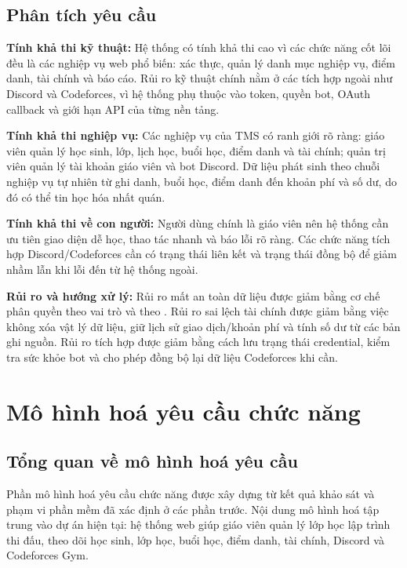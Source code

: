 \documentclass[12pt,a4paper]{article}
\newcommand{\code}[1]{{\ttfamily\seqsplit{#1}}}
\begin{document}
\subsection{Phân tích yêu cầu}

\textbf{Tính khả thi kỹ thuật:} Hệ thống có tính khả thi cao vì các chức năng
cốt lõi đều là các nghiệp vụ web phổ biến: xác thực, quản lý danh mục nghiệp
vụ, điểm danh, tài chính và báo cáo. Rủi ro kỹ thuật chính nằm ở các tích hợp
ngoài như Discord và Codeforces, vì hệ thống phụ thuộc vào token, quyền bot,
OAuth callback và giới hạn API của từng nền tảng.

\textbf{Tính khả thi nghiệp vụ:} Các nghiệp vụ của TMS có ranh giới rõ ràng:
giáo viên quản lý học sinh, lớp, lịch học, buổi học, điểm danh và tài chính;
quản trị viên quản lý tài khoản giáo viên và bot Discord. Dữ liệu phát sinh
theo chuỗi nghiệp vụ tự nhiên từ ghi danh, buổi học, điểm danh đến khoản phí và
số dư, do đó có thể tin học hóa nhất quán.

\textbf{Tính khả thi về con người:} Người dùng chính là giáo viên nên hệ thống
cần ưu tiên giao diện dễ học, thao tác nhanh và báo lỗi rõ ràng. Các chức năng
tích hợp Discord/Codeforces cần có trạng thái liên kết và trạng thái đồng bộ để
giảm nhầm lẫn khi lỗi đến từ hệ thống ngoài.

\textbf{Rủi ro và hướng xử lý:} Rủi ro mất an toàn dữ liệu được giảm bằng cơ chế
phân quyền theo vai trò và theo \code{teacher\_id}. Rủi ro sai lệch tài chính
được giảm bằng việc không xóa vật lý dữ liệu, giữ lịch sử giao dịch/khoản phí
và tính số dư từ các bản ghi nguồn. Rủi ro tích hợp được giảm bằng cách lưu
trạng thái credential, kiểm tra sức khỏe bot và cho phép đồng bộ lại dữ liệu
Codeforces khi cần.

\clearpage

\setcounter{section}{3}
\section{Mô hình hoá yêu cầu chức năng}

\subsection{Tổng quan về mô hình hoá yêu cầu}

Phần mô hình hoá yêu cầu chức năng được xây dựng từ kết quả khảo sát và phạm vi
phần mềm đã xác định ở các phần trước. Nội dung mô hình hoá tập trung vào dự án
hiện tại: hệ thống web giúp giáo viên quản lý lớp học lập trình thi đấu, theo
dõi học sinh, lớp học, buổi học, điểm danh, tài chính, Discord và Codeforces
Gym.
\end{document}
